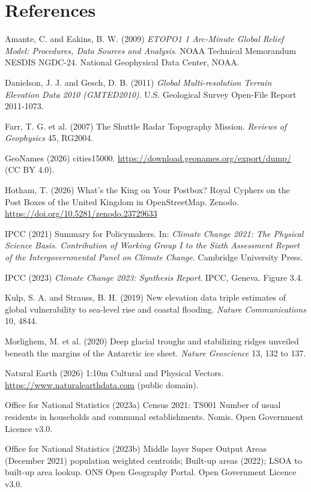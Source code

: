\documentclass[11pt,a4paper]{article}
\begin{document}
\section*{References}
\begin{small}
\setlength{\parskip}{0.3em}

Amante, C. and Eakins, B. W. (2009) \emph{ETOPO1 1 Arc-Minute Global Relief Model: Procedures, Data Sources and Analysis}. NOAA Technical Memorandum NESDIS NGDC-24. National Geophysical Data Center, NOAA.

Danielson, J. J. and Gesch, D. B. (2011) \emph{Global Multi-resolution Terrain Elevation Data 2010 (GMTED2010)}. U.S. Geological Survey Open-File Report 2011-1073.

Farr, T. G. et al. (2007) The Shuttle Radar Topography Mission. \emph{Reviews of Geophysics} 45, RG2004.

GeoNames (2026) cities15000. \url{https://download.geonames.org/export/dump/} (CC BY 4.0).

Hotham, T. (2026) What's the King on Your Postbox? Royal Cyphers on the Post Boxes of the United Kingdom in OpenStreetMap. Zenodo. \url{https://doi.org/10.5281/zenodo.23729633}

IPCC (2021) Summary for Policymakers. In: \emph{Climate Change 2021: The Physical Science Basis. Contribution of Working Group I to the Sixth Assessment Report of the Intergovernmental Panel on Climate Change}. Cambridge University Press.

IPCC (2023) \emph{Climate Change 2023: Synthesis Report}. IPCC, Geneva. Figure 3.4.

Kulp, S. A. and Strauss, B. H. (2019) New elevation data triple estimates of global vulnerability to sea-level rise and coastal flooding. \emph{Nature Communications} 10, 4844.

Morlighem, M. et al. (2020) Deep glacial troughs and stabilizing ridges unveiled beneath the margins of the Antarctic ice sheet. \emph{Nature Geoscience} 13, 132 to 137.

Natural Earth (2026) 1:10m Cultural and Physical Vectors. \url{https://www.naturalearthdata.com} (public domain).

Office for National Statistics (2023a) Census 2021: TS001 Number of usual residents in households and communal establishments. Nomis. Open Government Licence v3.0.

Office for National Statistics (2023b) Middle layer Super Output Areas (December 2021) population weighted centroids; Built-up areas (2022); LSOA to built-up area lookup. ONS Open Geography Portal. Open Government Licence v3.0.


\end{small}
\end{document}
